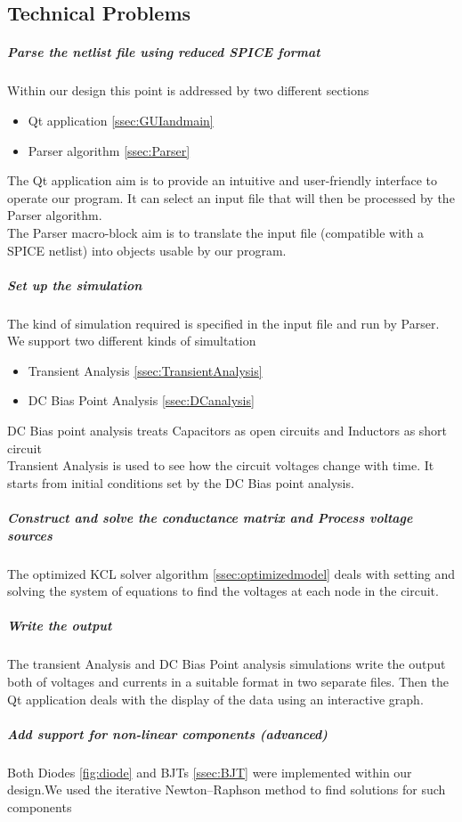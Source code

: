 \documentclass{article}
\begin{document}
\subsection{Technical Problems}
\subparagraph{Parse the netlist file using reduced SPICE format}
Within our design this point is addressed by two different sections
\begin{itemize}
    \item Qt application \ref{ssec:GUIandmain}
    \item Parser algorithm \ref{ssec:Parser}
\end{itemize}
The Qt application aim is to provide an intuitive and user-friendly interface to operate our program. It can select an input file that will then be processed by the Parser algorithm.\\
The Parser macro-block aim is to translate the input file (compatible with a SPICE netlist) into objects usable by our program.\\
\subparagraph{Set up the simulation }
The kind of simulation required is specified in the input file and run by Parser.\\
We support two different kinds of simultation
\begin{itemize}
    \item Transient Analysis \ref{ssec:TransientAnalysis}
    \item DC Bias Point Analysis \ref{ssec:DCanalysis}
\end{itemize}
DC Bias point analysis treats Capacitors as open circuits and Inductors as short circuit\\
Transient Analysis is used to see how the circuit voltages change with time. It starts from initial conditions set by the DC Bias point analysis.
\subparagraph{Construct and solve the conductance matrix and Process voltage sources}
The optimized KCL solver algorithm \ref{ssec:optimizedmodel} deals with setting and solving the system of equations to find the voltages at each node in the circuit.
\subparagraph{Write the output}
The transient Analysis and DC Bias Point analysis simulations write the output both of voltages and currents in a suitable format in two separate files. Then the Qt application deals with the display of the data using an interactive graph.
\subparagraph{ Add support for non-linear components (advanced)}
Both Diodes \ref{fig:diode} and BJTs \ref{ssec:BJT} were implemented within our design.We used the iterative Newton–Raphson method to find solutions for such components\bigbreak


\newpage
\end{document}
